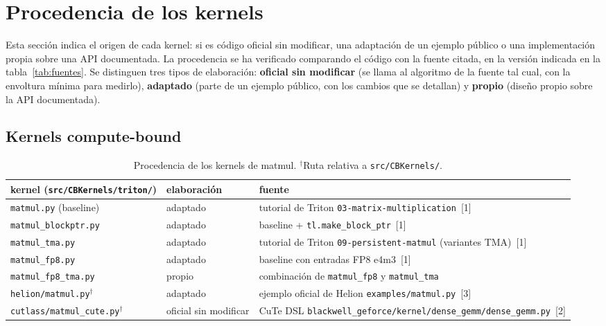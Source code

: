 
\section{Procedencia de los kernels}
\label{sec:procedencia}

Esta sección indica el origen de cada kernel: si es código oficial sin modificar, una
adaptación de un ejemplo público o una implementación propia sobre una API documentada.
La procedencia se ha verificado comparando el código con la fuente citada, en la versión
indicada en la tabla~\ref{tab:fuentes}. Se distinguen tres tipos de elaboración:
\textbf{oficial sin modificar} (se llama al algoritmo de la fuente tal cual, con la
envoltura mínima para medirlo), \textbf{adaptado} (parte de un ejemplo público, con los
cambios que se detallan) y \textbf{propio} (diseño propio sobre la API documentada).

\subsection{Kernels compute-bound}

\begin{table}[htbp]
  \centering\small
  \begin{tabularx}{\linewidth}{llX}
    \toprule
    kernel (\texttt{src/CBKernels/triton/}) & elaboración & fuente \\
    \midrule
    \texttt{matmul.py} (baseline) & adaptado & tutorial de Triton \texttt{03-matrix-multiplication}~[1] \\
    \texttt{matmul\_blockptr.py} & adaptado & baseline + \texttt{tl.make\_block\_ptr}~[1] \\
    \texttt{matmul\_tma.py} & adaptado & tutorial de Triton \texttt{09-persistent-matmul} (variantes TMA)~[1] \\
    \texttt{matmul\_fp8.py} & adaptado & baseline con entradas FP8 e4m3~[1] \\
    \texttt{matmul\_fp8\_tma.py} & propio & combinación de \texttt{matmul\_fp8} y \texttt{matmul\_tma} \\
    \midrule
    \texttt{helion/matmul.py}$^\dagger$ & adaptado & ejemplo oficial de Helion \texttt{examples/matmul.py}~[3] \\
    \texttt{cutlass/matmul\_cute.py}$^\dagger$ & oficial sin modificar & CuTe DSL \texttt{blackwell\_geforce/kernel/dense\_gemm/dense\_gemm.py}~[2] \\
    \bottomrule
  \end{tabularx}
  \caption{Procedencia de los kernels de matmul. $^\dagger$Ruta relativa a \texttt{src/CBKernels/}.}
  \label{tab:procedencia-cb}
\end{table}

